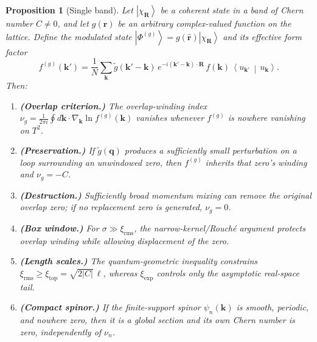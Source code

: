 \documentclass[aps,prb,onecolumn,nofootinbib,superscriptaddress]{revtex4-2}
\newtheorem{proposition}{Proposition}
\newcommand{\mbf}[1]{\mathbf{#1}}
\newcommand{\ket}[1]{\left|#1\right\rangle}
\newcommand{\braket}[2]{\left\langle#1\,\middle|\,#2\right\rangle}
\begin{document}
\begin{proposition}[Single band]\label{prop:single}
Let $\ket{\chi_{\mbf{R}}}$ be a coherent state in a band of Chern number $C \neq 0$, and let $g(\mbf{r})$ be an arbitrary complex-valued function on the lattice. Define the modulated state $\ket{\Phi^{(g)}} = g(\hat{\mbf{r}})\ket{\chi_{\mbf{R}}}$ and its effective form factor
\begin{equation}
f^{(g)}(\mbf{k}') = \frac{1}{N}\sum_{\mbf{k}} \tilde{g}(\mbf{k}'-\mbf{k})\,e^{-i(\mbf{k}'-\mbf{k})\cdot\mbf{R}}\, f(\mbf{k})\,\braket{u_{\mbf{k}'}}{u_{\mbf{k}}}.
\end{equation}
Then:
\begin{enumerate}
\item[(i)] \textbf{(Overlap criterion.)} The overlap-winding index $\nu_g=\frac{1}{2\pi i}\oint d\mbf{k}\cdot\nabla_{\mbf{k}}\ln f^{(g)}(\mbf{k})$ vanishes whenever $f^{(g)}$ is nowhere vanishing on $T^2$.
\item[(ii)] \textbf{(Preservation.)} If $\tilde{g}(\mbf{q})$ produces a sufficiently small perturbation on a loop surrounding an unwindowed zero, then $f^{(g)}$ inherits that zero's winding and $\nu_g=-C$.
\item[(iii)] \textbf{(Destruction.)} Sufficiently broad momentum mixing can remove the original overlap zero; if no replacement zero is generated, $\nu_g=0$.
\item[(iv)] \textbf{(Box window.)} For $\sigma\gg\xi_{\mathrm{rms}}$, the narrow-kernel/Rouch\'{e} argument protects overlap winding while allowing displacement of the zero.
\item[(v)] \textbf{(Length scales.)} The quantum-geometric inequality constrains $\xi_{\mathrm{rms}}\geq\xi_{\mathrm{top}}=\sqrt{2|C|}\,\ell$, whereas $\xi_{\mathrm{exp}}$ controls only the asymptotic real-space tail.
\item[(vi)] \textbf{(Compact spinor.)} If the finite-support spinor $\psi_n(\mbf{k})$ is smooth, periodic, and nowhere zero, then it is a global section and its own Chern number is zero, independently of $\nu_n$.
\end{enumerate}
\end{proposition}
\end{document}
